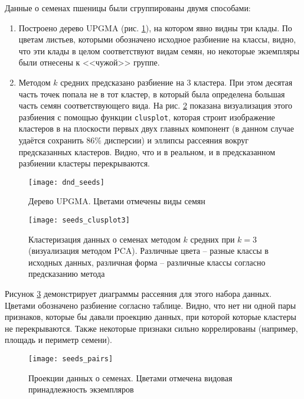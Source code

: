 \documentclass[a4paper,12pt]{article} %
\begin{document}
Данные о семенах пшеницы были сгруппированы двумя способами:
\begin{enumerate}
    \item Построено дерево UPGMA (рис. \ref{fig:dnd_seeds}), на котором явно видны три клады. По цветам листьев, которыми обозначено исходное разбиение на классы, видно, что эти клады в целом соответствуют видам семян, но некоторые экземпляры были отнесены к <<чужой>> группе.
    \item Методом $ k $ средних предсказано разбиение на $ 3 $ кластера. При этом десятая часть точек попала не в тот кластер, в который была определена большая часть семян соответствующего вида. На рис. \ref{fig:seeds_pca} показана визуализация этого разбиения с помощью функции \texttt{clusplot}, которая строит изображение кластеров в на плоскости первых двух главных компонент (в данном случае удаётся сохранить $ 86\% $ дисперсии) и эллипсы рассеяния вокруг предсказанных кластеров. Видно, что и в реальном, и в предсказанном разбиении кластеры перекрываются.
\end{enumerate}

\begin{figure}[H]
    \centering \texttt{[image: dnd\_seeds]}
    \caption{Дерево UPGMA. Цветами отмечены виды семян}
    \label{fig:dnd_seeds}
\end{figure}

\begin{figure}[H]
    \centering \texttt{[image: seeds\_clusplot3]}
    \caption{Кластеризация данных о семенах методом $k$ средних при $k=3$ (визуализация методом PCA). Различные цвета -- разные классы в исходных данных, различная форма -- различные классы согласно предсказанию метода}
    \label{fig:seeds_pca}
\end{figure}

\newpage
Рисунок \ref{fig:seeds_pairs} демонстрирует диаграммы рассеяния для этого набора данных. Цветами обозначено разбиение согласно таблице. Видно, что нет ни одной пары признаков, которые бы давали проекцию данных, при которой которые кластеры не перекрываются. Также некоторые признаки сильно коррелированы (например, площадь и периметр семени).

\begin{figure}[H]
    \centering \texttt{[image: seeds\_pairs]}
    \caption{Проекции данных о семенах. Цветами отмечена видовая принадлежность экземпляров}
    \label{fig:seeds_pairs}
\end{figure}
\end{document}
